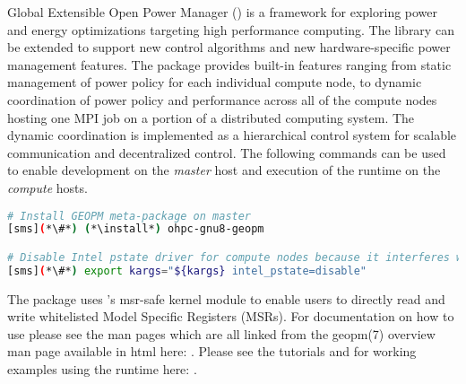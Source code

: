 Global Extensible Open Power Manager (\GEOPM{}) is a framework for exploring
power and energy optimizations targeting high performance computing.  The
library can be extended to support new control algorithms and new
hardware-specific power management features.  The \GEOPM{} package provides
built-in features ranging from static management of power policy for each
individual compute node, to dynamic coordination of power policy and
performance across all of the compute nodes hosting one MPI job on a portion of
a distributed computing system.  The dynamic coordination is implemented as a
hierarchical control system for scalable communication and decentralized
control. The following commands can be used to enable development on the 
{\em master} host and execution of the \GEOPM{} runtime on the {\em compute} 
hosts.

\begin{lstlisting}[language=bash,keywords={},upquote=true]
# Install GEOPM meta-package on master
[sms](*\#*) (*\install*) ohpc-gnu8-geopm

# Disable Intel pstate driver for compute nodes because it interferes with GEOPM's operation.
[sms](*\#*) export kargs="${kargs} intel_pstate=disable"
\end{lstlisting}

\noindent The \GEOPM{} package uses \OHPC{}'s msr-safe kernel module
to enable users to directly read and write whitelisted Model Specific
Registers (MSRs).  For documentation on how to use \GEOPM{} please see
the \GEOPM{} man pages which are all linked from the geopm(7) overview
man page available in html here:
\href{http://geopm.github.io/man/geopm.7.html}
{\color{blue}{http://geopm.github.io/man/geopm.7.html}}.
Please see the \GEOPM{} tutorials and for working examples using the
\GEOPM{} runtime here: \href{https://github.com/geopm/geopm/tree/dev/tutorial}
{\color{blue}{https://github.com/geopm/geopm/tree/dev/tutorial}}.
